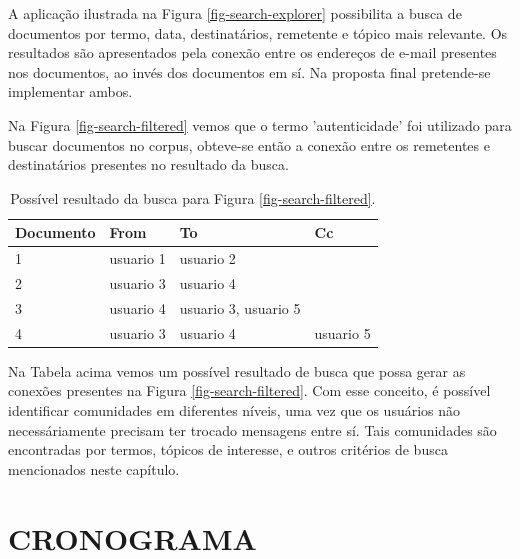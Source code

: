 \documentclass[12pt,a4paper]{article}
\begin{document}
A aplicação ilustrada na Figura \ref{fig-search-explorer} possibilita a busca de documentos por termo, data,
 destinatários, remetente e tópico mais relevante. Os resultados são apresentados pela conexão entre os
 endereços de e-mail presentes nos documentos, ao invés dos documentos em sí. Na proposta final pretende-se implementar ambos.

Na Figura \ref{fig-search-filtered} vemos que o termo 'autenticidade' foi utilizado para buscar documentos no corpus,
 obteve-se então a conexão entre os remetentes e destinatários presentes no resultado da busca.

\begin{table}[H]
  \centering
  \begin{tabular}{llll}
  Documento     & From                       & To                         & Cc         \\
  \hline
  1             & usuario 1                  & usuario 2                  &            \\
  2             & usuario 3                  & usuario 4                  &            \\
  3             & usuario 4                  & usuario 3, usuario 5       &             \\
  4             & usuario 3                  & usuario 4                  & usuario 5             \\
  \hline
  \end{tabular}
  \caption{Possível resultado da busca para Figura \ref{fig-search-filtered}.}
  \label{tab-nich-documents}
\end{table}

Na Tabela acima vemos um possível resultado de busca que possa gerar as conexões presentes na Figura \ref{fig-search-filtered}.
 Com esse conceito, é possível identificar comunidades em diferentes níveis, uma vez que os usuários não necessáriamente precisam ter trocado mensagens entre sí. Tais 
 comunidades são encontradas por termos, tópicos de interesse, e outros critérios de busca mencionados neste capítulo.

\section{CRONOGRAMA} \label{sec:cronograma}
\end{document}
